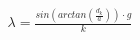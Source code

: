 \documentclass[preview]{standalone}
\begin{document}
\begin{align*}
\lambda = \frac{sin\left(arctan\left(\frac{d_k}{a}\right)\right) \cdot g}{k}
\end{align*}
\end{document}
